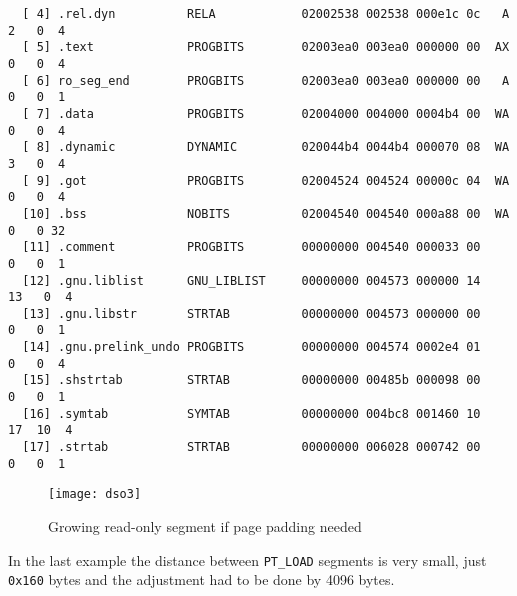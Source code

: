 \documentclass[twoside]{article}
\def\tts#1{\texttt{\small #1}}
\begin{document}
{{\begin{verbatim}
  [ 4] .rel.dyn          RELA            02002538 002538 000e1c 0c   A  2   0  4
  [ 5] .text             PROGBITS        02003ea0 003ea0 000000 00  AX  0   0  4
  [ 6] ro_seg_end        PROGBITS        02003ea0 003ea0 000000 00   A  0   0  1
  [ 7] .data             PROGBITS        02004000 004000 0004b4 00  WA  0   0  4
  [ 8] .dynamic          DYNAMIC         020044b4 0044b4 000070 08  WA  3   0  4
  [ 9] .got              PROGBITS        02004524 004524 00000c 04  WA  0   0  4
  [10] .bss              NOBITS          02004540 004540 000a88 00  WA  0   0 32
  [11] .comment          PROGBITS        00000000 004540 000033 00      0   0  1
  [12] .gnu.liblist      GNU_LIBLIST     00000000 004573 000000 14     13   0  4
  [13] .gnu.libstr       STRTAB          00000000 004573 000000 00      0   0  1
  [14] .gnu.prelink_undo PROGBITS        00000000 004574 0002e4 01      0   0  4
  [15] .shstrtab         STRTAB          00000000 00485b 000098 00      0   0  1
  [16] .symtab           SYMTAB          00000000 004bc8 001460 10     17  10  4
  [17] .strtab           STRTAB          00000000 006028 000742 00      0   0  1
\end{verbatim}}
}

\begin{figure}[!ht]
\centering
\texttt{[image: dso3]}
\caption{Growing read-only segment if page padding needed}
\end{figure}

In the last example the distance between \tts{PT\_LOAD} segments is very
small, just \tts{0x160} bytes and the adjustment had to be done by 4096
bytes.
\end{document}
